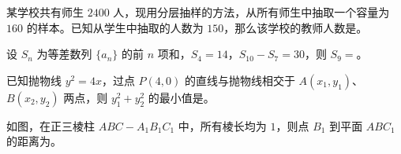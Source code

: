 \begin{question}
某学校共有师生 $2400$ 人，现用分层抽样的方法，从所有师生中抽取一个容量为 $160$ 的样本。已知从学生中抽取的人数为 $150$，那么该学校的教师人数是\gkblank{}。

\end{question}
\begin{question}
设 $S_n$ 为等差数列 $\{a_n\}$ 的前 $n$ 项和，$S_4=14$，$S_{10}-S_7=30$，则 $S_9=$\gkblank{}。

\end{question}
\begin{question}
已知抛物线 $y^2=4x$，过点 $P(4,0)$ 的直线与抛物线相交于 $A(x_1,y_1)$、$B(x_2,y_2)$ 两点，则 $y_1^2+y_2^2$ 的最小值是\gkblank{}。

\Needspace{0.4\textheight}
\end{question}
\begin{question}
如图，在正三棱柱 $ABC-A_1B_1C_1$ 中，所有棱长均为 $1$，则点 $B_1$ 到平面 $ABC_1$ 的距离为\gkblank{}。
\nopagebreak[4]
\begin{center}\end{center}
\nopagebreak[4]
\end{question}

